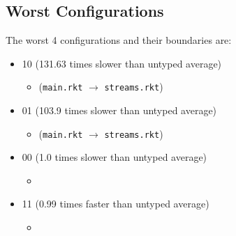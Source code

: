 \documentclass{article}
\newcommand{\mono}[1]{\texttt{#1}}
\begin{document}
\subsection{Worst Configurations}
The worst 4 configurations and their boundaries are:
\begin{itemize}
\item 10 (131.63 times slower than untyped average)
  \begin{itemize}
  \item (\mono{main.rkt} $\rightarrow$ \mono{streams.rkt})
  \end{itemize}
\item 01 (103.9 times slower than untyped average)
  \begin{itemize}
  \item (\mono{main.rkt} $\rightarrow$ \mono{streams.rkt})
  \end{itemize}
\item 00 (1.0 times slower than untyped average)
  \begin{itemize}
  \item 
  \end{itemize}
\item 11 (0.99 times faster than untyped average)
  \begin{itemize}
  \item 
  \end{itemize}


\end{itemize}
\end{document}
